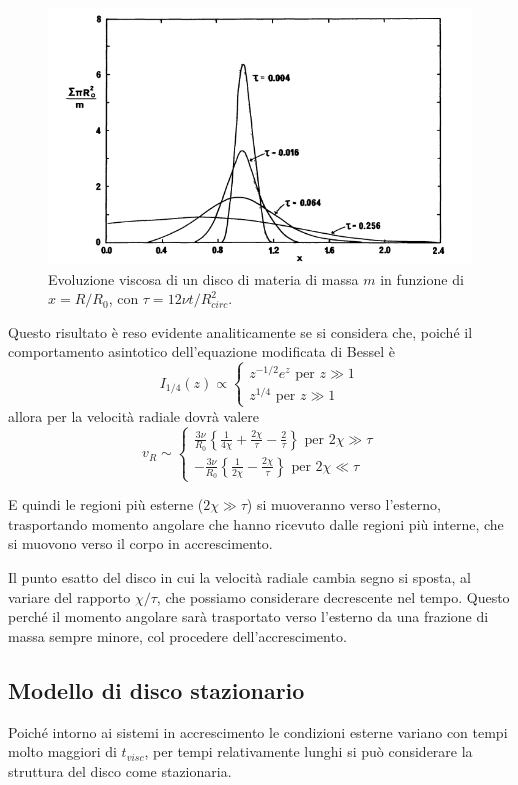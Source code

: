 \documentclass[a4paperbi]{article}
\begin{document}
	\begin{figure}[H]
		\centering
		\includegraphics[width=0.7\linewidth]{DensSuper}
		\caption{Evoluzione viscosa di un disco di materia di massa $m$ in funzione di $x=R/R_0$, con $\tau=12\nu t/R_{circ}^2$.}
		\label{fig:denssuper}
	\end{figure}

	Questo risultato è reso evidente analiticamente se si considera che, poiché il comportamento asintotico dell'equazione modificata di Bessel è
	\begin{equation*}
		I_{1/4}(z)\propto\begin{cases}
				z^{-1/2}e^z\text{ per $z\gg1$}\\
				z^{1/4}\text{ per $z\gg1$}
			\end{cases}
	\end{equation*}	 
	allora per la velocità radiale dovrà valere
	\begin{equation*}
		v_R\sim\begin{cases}
			\frac{3\nu}{R_0}\left\{\frac{1}{4\chi}+\frac{2\chi}{\tau}-\frac{2}{\tau}\right\}\text{ per $2\chi\gg\tau$}\\
			-\frac{3\nu}{R_0}\left\{\frac{1}{2\chi}-\frac{2\chi}{\tau}\right\}\text{ per $2\chi\ll\tau$}			
			\end{cases}
	\end{equation*}
	
	E quindi le regioni più esterne ($2\chi\gg\tau$) si muoveranno verso l'esterno, trasportando momento angolare che hanno ricevuto dalle regioni più interne, che si muovono verso il corpo in accrescimento.
	
	Il punto esatto del disco in cui la velocità radiale cambia segno si sposta, al variare del rapporto $\chi/\tau$, che possiamo considerare decrescente nel tempo. Questo perché il momento angolare sarà trasportato verso l'esterno da una frazione di massa sempre minore, col procedere dell'accrescimento.
	
	\subsection{Modello di disco stazionario}
	Poiché intorno ai sistemi in accrescimento le condizioni esterne variano con tempi molto maggiori di $t_{visc}$, per tempi relativamente lunghi si può considerare la struttura del disco come stazionaria.
	
\end{document}
